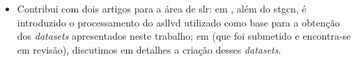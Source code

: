 \begin{itemize}
      \item Contribui com dois artigos para a área de \acrshort{slr}:
            em , além do \acrshort{stgcn}, é introduzido o processamento do \acrshort{asllvd} utilizado como base para a obtenção dos \textit{datasets} apresentados neste trabalho;
            em  (que foi submetido e encontra-se em revisão), discutimos em detalhes a criação desses \textit{datasets}.

\end{itemize}








